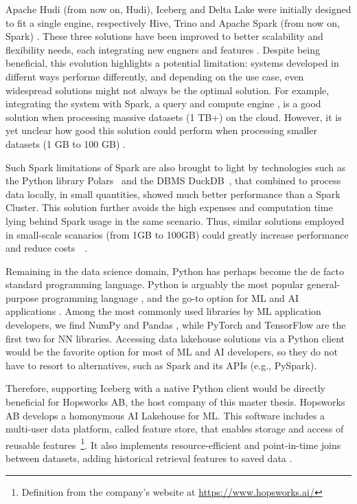 Apache Hudi (from now on, Hudi), Iceberg and Delta Lake were initially designed to fit a single engine, respectively Hive, Trino and Apache Spark (from now on, Spark) \cite{ApacheHudiVs}. These three solutions have been improved to better scalability and flexibility needs, each integrating new engners and features \cite{OngoingEvolutionTableFormat}. Despite being beneficial, this evolution highlights a potential limitation: systems developed in differnt ways performe differently, and depending on the use case, even widespread solutions might not always be the optimal solution. For example, integrating the system with Spark, a query and compute engine \cite{zahariaApacheSparkUnified2016}, is a good solution when processing massive datasets (1 TB+) on the cloud. However, it is yet unclear how good this solution could perform when processing smaller datasets (1 GB to 100 GB) \cite{Khazanchi1801362}. 

Such Spark limitations of Spark are also brought to light by technologies such as the Python library Polars~\cite{vinkWroteOneFastest2021} and the \gls{DBMS} DuckDB~\cite{raasveldtDuckDBEmbeddableAnalytical2019}, that combined to process data locally, in small quantities, showed much better performance than a Spark Cluster. This solution further avoids the high expenses and computation time lying behind Spark usage in the same scenario. Thus, similar solutions employed in small-scale scanarios (from 1GB to 100GB) could greatly increase performance and reduce costs~\cite{ebergenUpdatesH2OAi2023}~\cite{BenchmarkResultsSpark}.

Remaining in the data science domain, Python has perhaps become the de facto standard programming language. Python is arguably the most popular general-purpose programming language \cite{TIOBEIndex, StackOverflowDeveloper, PythonTopLanguage}, and the go-to option for \gls{ML} and \gls{AI} applications \cite{python-machine-learning}. Among the most commonly used libraries by \gls{ML} application developers, we find NumPy and Pandas \cite{StackOverflowDeveloper}, while PyTorch and TensorFlow are the first two for \gls{NN} libraries. Accessing data lakehouse solutions via a Python client would be the favorite option for most of \gls{ML} and \gls{AI} developers, so they do not have to resort to alternatives, such as Spark and its \glspl{API} (e.g., PySpark). 

Therefore, supporting Iceberg with a native Python client would be directly beneficial for Hopsworks AB, the host company of this master thesis. Hopsworks AB develops a homonymous \gls{AI} Lakehouse for \gls{ML}. This software includes a multi-user data platform, called feature store, that enables storage and access of reusable features~\footnote{Definition from the company's website at \url{https://www.hopsworks.ai/}}. It also implements resource-efficient and point-in-time joins between datasets, adding historical retrieval features to saved data \cite{Pettersson1695672}.

